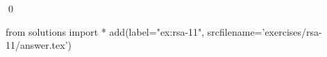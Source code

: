 
\begin{ex} 
  \label{ex:rsa-11}
  
  \qed
\end{ex} 
\begin{python0}
from solutions import *
add(label="ex:rsa-11",
    srcfilename='exercises/rsa-11/answer.tex') 
\end{python0}
